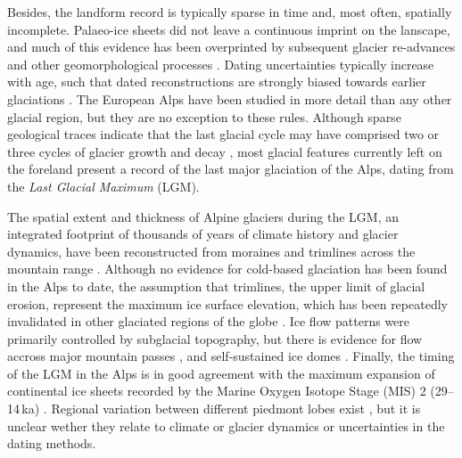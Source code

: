 \documentclass[tc, manuscript]{copernicus}
\begin{document}
    Besides, the landform record is typically sparse in time and, most often,
    spatially incomplete. Palaeo-ice sheets did not leave a continuous imprint
    on the lanscape, and much of this evidence has been overprinted by
    subsequent glacier re-advances and other geomorphological processes
    \citep[e.g.,][]{Kleman.1994, Kleman.etal.2006, Kleman.etal.2010}. Dating
    uncertainties typically increase with age, such that dated reconstructions
    are strongly biased towards earlier glaciations \citep{Heyman.etal.2011}.
    The European Alps have been studied in more detail than any other glacial
    region, but they are no exception to these rules. Although sparse
    geological traces indicate that the last glacial cycle may have comprised
    two or three cycles of glacier growth and decay \citep{Preusser.2004,
    Ivy-Ochs.etal.2008}, most glacial features currently left on the foreland
    present a record of the last major glaciation of the Alps, dating from the
    \emph{Last Glacial Maximum} (LGM).

    The spatial extent and thickness of Alpine glaciers during the LGM, an
    integrated footprint of thousands of years of climate history and glacier
    dynamics, have been reconstructed from moraines and trimlines across the
    mountain range \citep[e.g.,][]{Bini.etal.2009, Coutterand.2010,
    Husen.2011}. Although no evidence for cold-based glaciation has been found
    in the Alps to date, the assumption that trimlines, the upper limit of
    glacial erosion, represent the maximum ice surface elevation, which has
    been repeatedly invalidated in other glaciated regions of the globe
    \citep[e.g.,][]{Kleman.1994, Kleman.etal.2010, Fabel.etal.2012}. Ice flow
    patterns were primarily controlled by subglacial topography, but there is
    evidence for flow accross major mountain passes
    \citep[e.g.,][]{Coutterand.2010, Kelly.etal.2004, Husen.2011}, and
    self-sustained ice domes \citep{Bini.etal.2009}. Finally, the timing of the
    LGM in the Alps \citep{Ivy-Ochs.etal.2008, Monegato.etal.2017} is in good
    agreement with the maximum expansion of continental ice sheets recorded by
    the Marine Oxygen Isotope Stage (MIS) 2 (29--14\,ka)
    \citep{Lisiecki.Raymo.2005}. Regional variation between different piedmont
    lobes exist \citep[Fig.~5]{Wirsig.etal.2016}, but it is unclear wether they
    relate to climate or glacier dynamics \citep{Monegato.etal.2017} or
    uncertainties in the dating methods.
\end{document}
